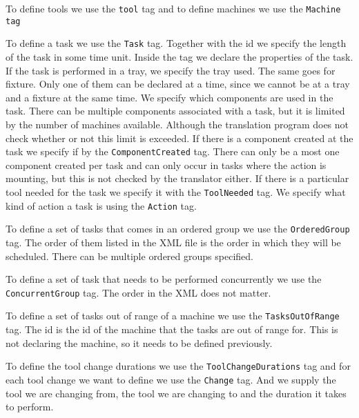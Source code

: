 To define tools we use the \texttt{tool} tag and to define machines we use the \texttt{Machine tag}

To define a task we use the \texttt{Task} tag. Together with the id we specify the length of the task in some time unit. Inside the tag we declare the properties of the task. If the task is performed in a tray, we specify the tray used. The same goes for fixture. Only one of them can be declared at a time, since we cannot be at a tray and a fixture at the same time. We specify which components are used in the task. There can be multiple components associated with a task, but it is limited by the number of machines available. Although the translation program does not check whether or not this limit is exceeded. If there is a component created at the task we specify if by the \texttt{ComponentCreated} tag. There can only be a most one component created per task and can only occur in tasks where the action is mounting, but this is not checked by the translator either. If there is a particular tool needed for the task we specify it with the \texttt{ToolNeeded} tag. We specify what kind of action a task is using the \texttt{Action} tag.

To define a set of tasks that comes in an ordered group we use the \texttt{OrderedGroup} tag. The order of them listed in the XML file is the order in which they will be scheduled. There can be multiple ordered groups specified.

To define a set of task that needs to be performed concurrently we use the \texttt{ConcurrentGroup} tag. The order in the XML does not matter.

To define a set of tasks out of range of a machine we use the \texttt{TasksOutOfRange} tag. The id is the id of the machine that the tasks are out of range for. This is not declaring the machine, so it needs to be defined previously.

To define the tool change durations we use the \texttt{ToolChangeDurations} tag and for each tool change we want to define we use the \texttt{Change} tag. And we supply the tool we are changing from, the tool we are changing to and the duration it takes to perform.

\begin{figure}

\end{figure}


